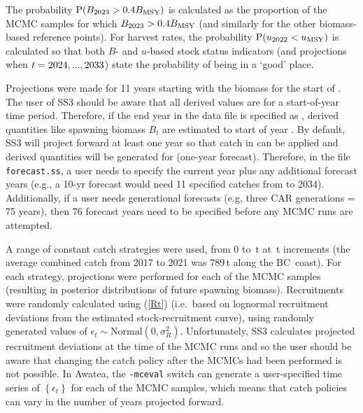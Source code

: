 \documentclass[11pt]{book}
\newcommand{\Bmsy}{B_\text{MSY}}
\newcommand{\umsy}{u_\text{MSY}}
\newcommand{\code}[1]{\normalsize\texttt{#1}\normalsize}%
\newcommand{\eref}[1]{(\ref{#1})}
\begin{document}
The probability $\text{P}(B_{\finalYr} > 0.4\Bmsy)$ is calculated as the proportion of the \Nbase{} MCMC samples for which $B_{\finalYr} > 0.4\Bmsy$ (and similarly for the other biomass-based reference points).
For harvest rates, the probability $\text{P}(u_{\prevYear} < \umsy)$ is calculated so that both $B$- and $u$-based stock status indicators (and projections when $t=2024,...,2033$) state the probability of being in a `good' place.

Projections were made for 11 years starting with the biomass for the start of \currYear.
The user of SS3 should be aware that all derived values are for a start-of-year time period.
Therefore, if the end year in the data file is specified as \prevYear, derived quantities like spawning biomass $B_t$ are estimated to start of year \prevYear.
By default, SS3 will project forward at least one year so that catch in \prevYear{} can be applied and derived quantities will be generated for \currYear{} (one-year forecast).
Therefore, in the file \code{forecast.ss}, a user needs to specify the current year plus any additional forecast years (e.g., a 10-yr forecast would need 11 specified catches from \currYear{} to 2034).
Additionally, if a user needs generational forecasts (e.g, three CAR generations = 75 years), then 76 forecast years need to be specified before any MCMC runs are attempted.

A range of constant catch strategies were used, from 0 to \policyMax\,t at \policyInc\,t increments (the average combined catch from 2017 to 2021 was 789\,t along the BC~coast).
For each strategy, projections were performed for each of the \Nbase{} MCMC samples (resulting in posterior distributions of future spawning biomass).
Recruitments were randomly calculated using \eref{Rt} (i.e.~based on lognormal recruitment deviations from the estimated stock-recruitment curve), using randomly generated values of $\epsilon_t \sim \mbox{Normal}(0, \sigma_R^2)$. 
Unfortunately, SS3 calculates projected recruitment deviations at the time of the MCMC runs and so the user should be aware that changing the catch policy after the MCMCs had been performed is not possible. 
In Awatea, the \code{-mceval} switch can generate a user-specified time series of $\left\{ \epsilon_t \right\}$ for each of the MCMC samples, which means that catch policies can vary in the number of years projected forward.



\renewcommand\bibsection{\section{REFERENCES -- MODEL EQUATIONS}}

\end{document}
